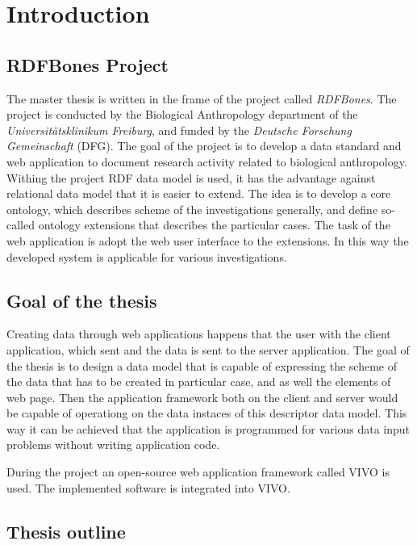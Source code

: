 \chapter{Introduction}


\section{RDFBones Project}

The master thesis is written in the frame of the project called \textit{RDFBones}. The project is conducted by the Biological Anthropology department of the \textit{Universitätsklinikum Freiburg}, and funded by the \textit{Deutsche Forschung Gemeinschaft} (DFG). 
The goal of the project is to develop a data standard and web application to document research activity related to biological anthropology. Withing the project RDF data model is used, it has the advantage against relational data model that it is easier to extend. The idea is to develop a core ontology, which describes scheme of the investigations generally, and define so-called ontology extensions that describes the particular cases. The task of the web application is adopt the web user interface to the extensions. In this way the developed system is applicable for various investigations. \cite{infrastructure}

\section{Goal of the thesis}

Creating data through web applications happens that the user  with the client application, which sent and the data is sent to the server application. The goal of the thesis is to design a data model that is capable of expressing the scheme of the data that has to be created in particular case, and as well the elements of web page. Then the application framework both on the client and server would be capable of operationg on the data instaces of this descriptor data model. This way it can be achieved that the application is programmed for various data input problems without writing application code. 

During the project an open-source web application framework called VIVO is used. The implemented software is integrated into VIVO.

\section{Thesis outline}

